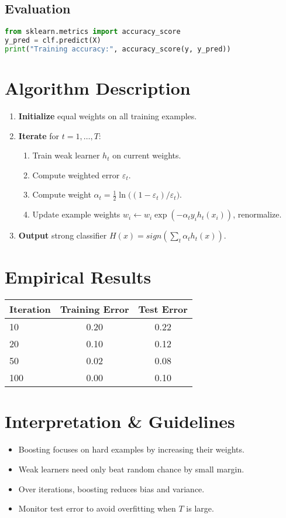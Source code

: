 \documentclass[11pt]{article}
\begin{document}
\subsection{Evaluation}
\begin{lstlisting}[language=Python]
from sklearn.metrics import accuracy_score
y_pred = clf.predict(X)
print("Training accuracy:", accuracy_score(y, y_pred))
\end{lstlisting}

\section{Algorithm Description}
\begin{enumerate}
  \item \textbf{Initialize} equal weights on all training examples.
  \item \textbf{Iterate} for $t=1,\dots,T$:
    \begin{enumerate}
      \item Train weak learner $h_t$ on current weights.
      \item Compute weighted error $\varepsilon_t$.
      \item Compute weight $\alpha_t = \tfrac12\ln\bigl((1-\varepsilon_t)/\varepsilon_t\bigr)$.
      \item Update example weights $w_i \leftarrow w_i\exp(-\alpha_t y_i h_t(x_i))$, renormalize.
    \end{enumerate}
  \item \textbf{Output} strong classifier $H(x)=sign(\sum_t \alpha_t h_t(x))$.
\end{enumerate}

\section{Empirical Results}
\begin{tabular}{lcc}
\hline
Iteration & Training Error & Test Error \\
\hline
10  & 0.20 & 0.22 \\
20  & 0.10 & 0.12 \\
50  & 0.02 & 0.08 \\
100 & 0.00 & 0.10 \\
\hline
\end{tabular}

\section{Interpretation \& Guidelines}
\begin{itemize}
  \item Boosting focuses on hard examples by increasing their weights.
  \item Weak learners need only beat random chance by small margin.
  \item Over iterations, boosting reduces bias and variance.
  \item Monitor test error to avoid overfitting when $T$ is large.
\end{itemize}
\end{document}
